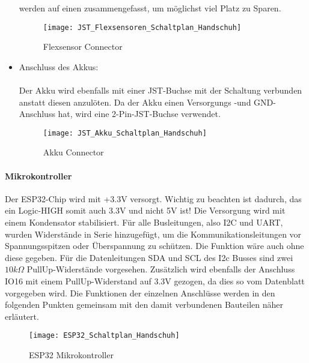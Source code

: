 \documentclass[titlepage,12pt,twoside]{article}
\begin{document}
\begin{itemize}
		  werden auf einen zusammengefasst, um möglichst viel Platz zu Sparen. \\
		  \begin{figure}[H]
			\begin{center}
				\scalebox{0.5}
				{\texttt{[image: JST\_Flexsensoren\_Schaltplan\_Handschuh]}}
				\caption{Flexsensor Connector}
				\label{fig:JST_Flexsensoren_Schaltplan_Handschuh}				
			\end{center}
		\end{figure}
	\item Anschluss des Akkus: \\
		  \\
		  Der Akku wird ebenfalls mit einer JST-Buchse mit der Schaltung verbunden anstatt diesen anzulöten. Da der Akku einen
		  Versorgungs -und GND-Anschluss hat, wird eine 2-Pin-JST-Buchse verwendet. \\
		  \begin{figure}[H]
			\begin{center}
				\scalebox{0.5}
				{\texttt{[image: JST\_Akku\_Schaltplan\_Handschuh]}}
				\caption{Akku Connector}
				\label{fig:JST_Akku_Schaltplan_Handschuh}				
			\end{center}
		\end{figure}\end{itemize}

\paragraph{Mikrokontroller} 
\hfill \break
\hfill \break
Der ESP32-Chip wird mit +3.3V versorgt. Wichtig zu beachten ist dadurch, das ein Logic-HIGH somit auch 3.3V und nicht 5V ist!
Die Versorgung wird mit einem Kondensator stabilisiert. Für alle Busleitungen, also I2C und UART, wurden Widerstände in Serie
hinzugefügt, um die Kommunikationsleitungen vor Spannungsspitzen oder Überspannung zu schützen. Die Funktion wäre auch ohne diese
gegeben. Für die Datenleitungen SDA und SCL des I2c Busses sind zwei $10k\Omega$ PullUp-Widerstände vorgesehen. Zusätzlich 
wird ebenfalls der Anschluss IO16 mit einem PullUp-Widerstand auf 3.3V gezogen, da dies so vom Datenblatt vorgegeben wird. 
Die Funktionen der einzelnen Anschlüsse werden in den folgenden Punkten gemeinsam mit den damit verbundenen Bauteilen näher erläutert. \\
\begin{figure}[H]
	\begin{center}
		\scalebox{0.5}
		{\texttt{[image: ESP32\_Schaltplan\_Handschuh]}}
		\caption{ESP32 Mikrokontroller}
		\label{fig:ESP32_Schaltplan_Handschuh}	
	\end{center}
\end{figure}
\end{document}

